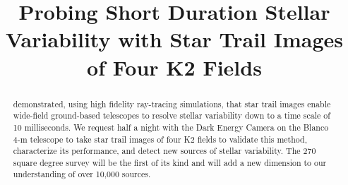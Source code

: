\documentclass[11pt]{article}
\begin{document}
\title{Probing Short Duration Stellar Variability with Star Trail Images of Four K2 Fields}



%


\begin{abstract}
\citealt{2018arXiv180806977T} demonstrated, using high fidelity ray-tracing simulations, that star trail images enable wide-field ground-based telescopes to resolve stellar variability down to a time scale of 10 milliseconds. We request half a night with the Dark Energy Camera on the Blanco 4-m telescope to take star trail images of four K2 fields to validate this method, characterize its performance, and detect new sources of stellar variability. The 270 square degree survey will be the first of its kind and will add a new dimension to our understanding of over 10,000 sources.

\end{abstract}

\end{document}
